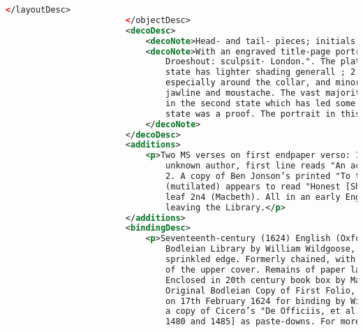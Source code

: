 \documentclass[class=article, crop=false]{standalone}
\begin{document}
\begin{lstlisting}[language=XML]
                            </layoutDesc>
                        </objectDesc>
                        <decoDesc>
                            <decoNote>Head- and tail- pieces; initials.</decoNote>
                            <decoNote>With an engraved title-page portrait of the author signed: "Martin-
                                Droeshout: sculpsit· London.". The plate exists in 2 states: 1. The earlier
                                state has lighter shading generall ; 2. Later state has heavier shading,
                                especially around the collar, and minor differences particularly with the
                                jawline and moustache. The vast majority of surviving copies have the plate
                                in the second state which has led some scholars to conclude that the earlier
                                state was a proof. The portrait in this copy is the second state.
                            </decoNote>
                        </decoDesc>
                        <additions>
                            <p>Two MS verses on first endpaper verso: 1. 9 lines of verse by an
                                unknown author, first line reads "An active swain to make a leap was seen".
                                2. A copy of Ben Jonson’s printed "To the Reader"; MS note on t.p.
                                (mutilated) appears to read "Honest [Shakes]peare". Minor annotations on
                                leaf 2n4 (Macbeth). All in an early English hand, presumably added after
                                leaving the Library.</p>
                        </additions>
                        <bindingDesc>
                            <p>Seventeenth-century (1624) English (Oxford) smooth calf. Bound for the
                                Bodleian Library by William Wildgoose, with evidence of two cloth ties, red
                                sprinkled edge. Formerly chained, with evidence of chain staple at the head
                                of the upper cover. Remains of paper label at the head of the spine.
                                Enclosed in 20th century book box by Maltby of Oxford. See S. Gibson in
                                Original Bodleian Copy of First Folio, p. 12-13. One of four items sent out
                                on 17th February 1624 for binding by Wildgoose containing printed waste from
                                a copy of Cicero’s "De Officiis, et al." [Deventer: Richard Pafraet, between
                                1480 and 1485] as paste-downs. For more information on this work see: Bod.

\end{lstlisting}
\end{document}
